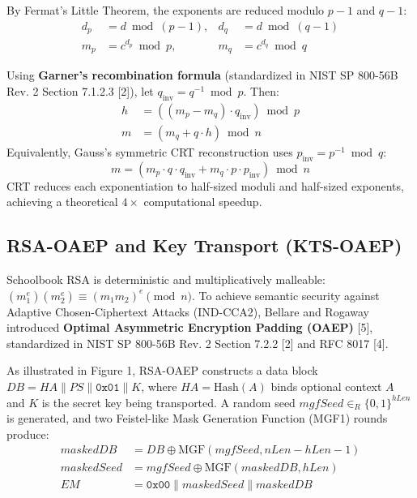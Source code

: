 \documentclass[10pt,twocolumn,letterpaper]{article}
\begin{document}
By Fermat's Little Theorem, the exponents are reduced modulo $p-1$ and $q-1$:
\begin{align}
    d_p &= d \bmod (p - 1), & d_q &= d \bmod (q - 1) \\
    m_p &= c^{d_p} \bmod p, & m_q &= c^{d_q} \bmod q
\end{align}

Using \textbf{Garner's recombination formula} (standardized in NIST SP 800-56B Rev. 2 Section 7.1.2.3 [2]), let $q_{\text{inv}} = q^{-1} \bmod p$. Then:
\begin{align}
    h &= ((m_p - m_q) \cdot q_{\text{inv}}) \bmod p \\
    m &= (m_q + q \cdot h) \bmod n
\end{align}
Equivalently, Gauss's symmetric CRT reconstruction uses $p_{\text{inv}} = p^{-1} \bmod q$:
\begin{equation}
    m = (m_p \cdot q \cdot q_{\text{inv}} + m_q \cdot p \cdot p_{\text{inv}}) \bmod n
\end{equation}
CRT reduces each exponentiation to half-sized moduli and half-sized exponents, achieving a theoretical $4\times$ computational speedup.

\subsection{RSA-OAEP and Key Transport (KTS-OAEP)}

Schoolbook RSA is deterministic and multiplicatively malleable: $(m_1^e)(m_2^e) \equiv (m_1 m_2)^e \pmod n$. To achieve semantic security against Adaptive Chosen-Ciphertext Attacks (IND-CCA2), Bellare and Rogaway introduced \textbf{Optimal Asymmetric Encryption Padding (OAEP)} [5], standardized in NIST SP 800-56B Rev. 2 Section 7.2.2 [2] and RFC 8017 [4].

As illustrated in Figure 1, RSA-OAEP constructs a data block $DB = HA \parallel PS \parallel \texttt{0x01} \parallel K$, where $HA = \text{Hash}(A)$ binds optional context $A$ and $K$ is the secret key being transported. A random seed $mgfSeed \in_R \{0,1\}^{hLen}$ is generated, and two Feistel-like Mask Generation Function (MGF1) rounds produce:
\begin{align}
    maskedDB &= DB \oplus \text{MGF}(mgfSeed, nLen - hLen - 1) \\
    maskedSeed &= mgfSeed \oplus \text{MGF}(maskedDB, hLen) \\
    EM &= \texttt{0x00} \parallel maskedSeed \parallel maskedDB
\end{align}
\end{document}
